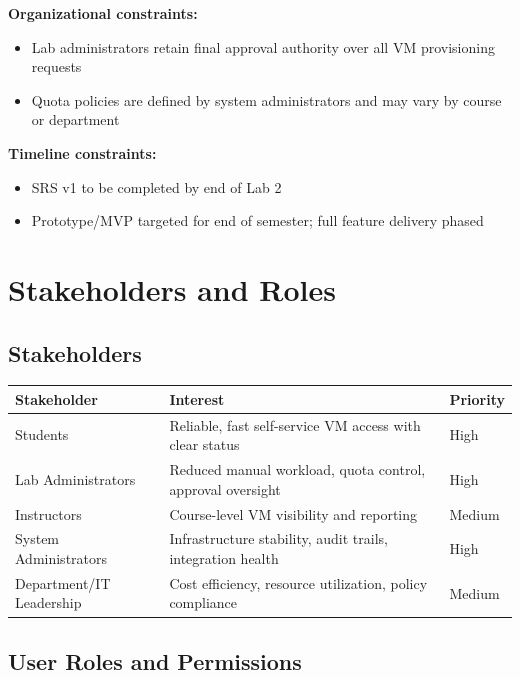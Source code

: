 \documentclass[12pt,letterpaper]{article}
\begin{document}
\textbf{Organizational constraints:}
\begin{itemize}
  \item Lab administrators retain final approval authority over all VM provisioning requests
  \item Quota policies are defined by system administrators and may vary by course or department
\end{itemize}

\textbf{Timeline constraints:}
\begin{itemize}
  \item SRS v1 to be completed by end of Lab 2
  \item Prototype/MVP targeted for end of semester; full feature delivery phased
\end{itemize}

\section{Stakeholders and Roles}

\subsection{Stakeholders}

\begin{tabularx}{\linewidth}{L{4cm} L{6cm} L{2.5cm}}
  \toprule
  \textbf{Stakeholder} & \textbf{Interest} & \textbf{Priority} \\
  \midrule
  Students & Reliable, fast self-service VM access with clear status & High \\
  \addlinespace
  Lab Administrators & Reduced manual workload, quota control, approval oversight & High \\
  \addlinespace
  Instructors & Course-level VM visibility and reporting & Medium \\
  \addlinespace
  System Administrators & Infrastructure stability, audit trails, integration health & High \\
  \addlinespace
  Department/IT Leadership & Cost efficiency, resource utilization, policy compliance & Medium \\
  \bottomrule
\end{tabularx}

\subsection{User Roles and Permissions}
\end{document}
